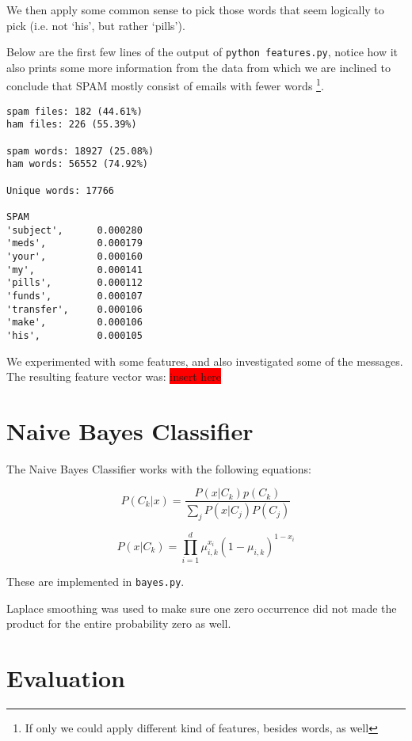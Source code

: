 \documentclass[a4paper,11pt]{article}
\newcommand{\todo}[1]{\colorbox{red}{\color{white}#1}}
\begin{document}
We then apply some common sense to pick those words that seem logically to 
pick (i.e. not `his', but rather `pills').  

Below are the first few lines of the output of \texttt{python features.py}, 
notice how it also prints some more information from the data from which we 
are inclined to conclude that SPAM mostly consist of emails with fewer words \footnote{If only we could apply different kind of features, besides words, as well}. 
\begin{center}
\begin{verbatim}
spam files: 182 (44.61%)
ham files: 226 (55.39%)

spam words: 18927 (25.08%)
ham words: 56552 (74.92%)

Unique words: 17766

SPAM
'subject',      0.000280
'meds',         0.000179
'your',         0.000160
'my',           0.000141
'pills',        0.000112
'funds',        0.000107
'transfer',     0.000106
'make',         0.000106
'his',          0.000105
\end{verbatim}
\end{center}

We experimented with some features, and also investigated some of the 
messages. The resulting feature vector was: \todo{insert here}

\section{Naive Bayes Classifier}
The Naive Bayes Classifier works with the following equations: 

\begin{equation}
P(C_k|x) = \frac{P(x|C_k)p(C_k)}{\sum_j P(x|C_j)P(C_j)}
\label{eq:1}
\end{equation}

\begin{equation}
P(x|C_k)= \prod_{i=1}^d \mu^{x_i}_{i, k}(1 - \mu_{i,k})^{1-x_i}
\label{eq:2}
\end{equation}

These are implemented in \texttt{bayes.py}. 

Laplace smoothing was used to make sure one zero occurrence did not made the
product for the entire probability zero as well. 


\section{Evaluation}
\end{document}
